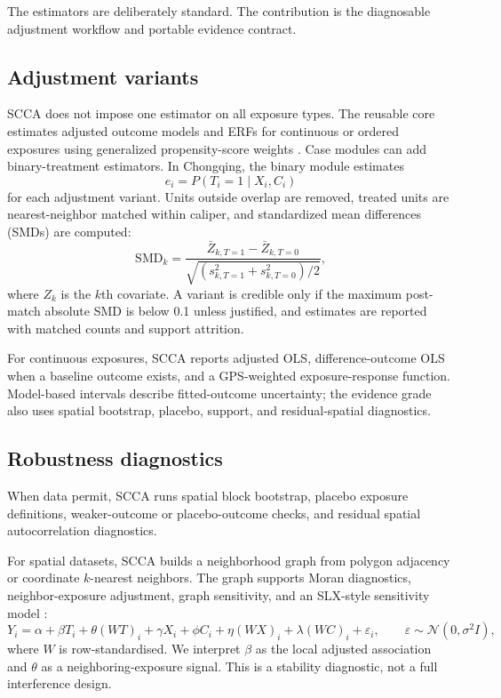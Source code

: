 \documentclass{article}
\begin{document}
The estimators are deliberately standard. The contribution is the diagnosable adjustment workflow and portable evidence contract.


\subsection{Adjustment variants}

SCCA does not impose one estimator on all exposure types. The reusable core estimates adjusted outcome models and ERFs for continuous or ordered exposures using generalized propensity-score weights \citep{hirano2004gps,zhao2020nonbinary}. Case modules can add binary-treatment estimators. In Chongqing, the binary module estimates
\begin{equation}
e_i = P(T_i = 1 \mid X_i, C_i)
\end{equation}
for each adjustment variant. Units outside overlap are removed, treated units are nearest-neighbor matched within caliper, and standardized mean differences (SMDs) are computed:
\begin{equation}
\mathrm{SMD}_k =
\frac{\bar{Z}_{k,T=1} - \bar{Z}_{k,T=0}}
{\sqrt{(s^2_{k,T=1} + s^2_{k,T=0})/2}},
\end{equation}
where $Z_k$ is the $k$th covariate. A variant is credible only if the maximum post-match absolute SMD is below 0.1 unless justified, and estimates are reported with matched counts and support attrition.

For continuous exposures, SCCA reports adjusted OLS, difference-outcome OLS when a baseline outcome exists, and a GPS-weighted exposure-response function. Model-based intervals describe fitted-outcome uncertainty; the evidence grade also uses spatial bootstrap, placebo, support, and residual-spatial diagnostics.

\subsection{Robustness diagnostics}

When data permit, SCCA runs spatial block bootstrap, placebo exposure definitions, weaker-outcome or placebo-outcome checks, and residual spatial autocorrelation diagnostics.

For spatial datasets, SCCA builds a neighborhood graph from polygon adjacency or coordinate $k$-nearest neighbors. The graph supports Moran diagnostics, neighbor-exposure adjustment, graph sensitivity, and an SLX-style sensitivity model \citep{lesage2009introduction}:
\begin{equation}
Y_i = \alpha + \beta T_i + \theta (WT)_i + \gamma X_i + \phi C_i + \eta (WX)_i + \lambda (WC)_i + \varepsilon_i,
\qquad \varepsilon \sim \mathcal{N}(0, \sigma^2 I),
\end{equation}
where $W$ is row-standardised. We interpret $\beta$ as the local adjusted association and $\theta$ as a neighboring-exposure signal. This is a stability diagnostic, not a full interference design.
\end{document}
